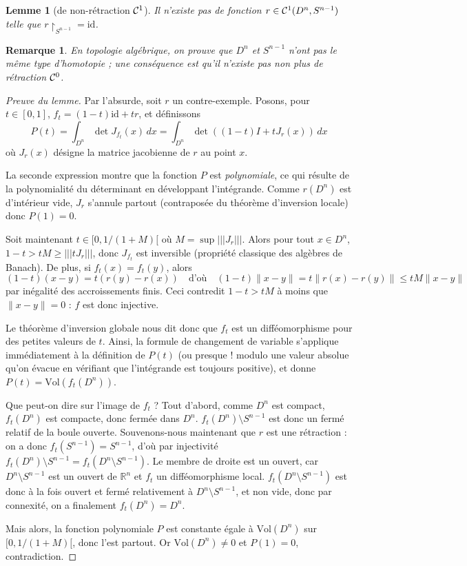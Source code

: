 \documentclass[a4paper, 11pt]{article}
\def\R{\mathbb{R}}
\def\Cf{{\cal{C}}}
\def\Vol{\mathrm{Vol}}
\newtheorem*{lemma}{Lemme}
\newtheorem*{remark}{Remarque}
\begin{document}
\begin{lemma}[de non-rétraction $\Cf^1$]
  Il n'existe pas de fonction $r \in \Cf^1(D^n, S^{n-1})$ telle que
  $r\restriction_{S^{n-1}} = \mathrm{id}$.
\end{lemma}
\begin{remark}
En topologie algébrique, on prouve que $D^n$ et $S^{n-1}$ n'ont pas le même type
d'homotopie ; une conséquence est qu'il n'existe pas non plus de rétraction
$\Cf^0$.
\end{remark}

\begin{proof}[Preuve du lemme]
  Par l'absurde, soit $r$ un contre-exemple.  
  Posons, pour $t \in [0,1]$, $f_t = (1-t)\mathrm{id} + tr$, et définissons
  \[ P(t) = \int_{D^n} \det J_{f_t}(x)\,dx = \int_{D^n} \det ((1-t)I +
    tJ_r(x))\,dx \]
  où $J_r(x)$ désigne la matrice jacobienne de $r$ au point $x$.

  La seconde expression montre que la fonction $P$ est \emph{polynomiale}, ce
  qui résulte de la polynomialité du déterminant en développant l'intégrande.
  Comme $r(D^n)$ est d'intérieur vide, $J_r$ s'annule partout (contraposée du
  théorème d'inversion locale) donc $P(1) = 0$.

  Soit maintenant $t \in [0,1/(1+M)[$ où $M = \sup |||J_r|||$. Alors pour tout
  $x \in D^n$, $1-t > tM \geq |||tJ_r|||$, donc $J_{f_t}$ est inversible
  (propriété classique des algèbres de Banach). De plus, si $f_t(x) = f_t(y)$,
  alors
  \[(1-t)(x-y) = t(r(y) - r(x)) \quad \text{d'où} \quad
    (1-t)\|x-y\| = t\|r(x) - r(y)\| \leq tM\|x-y\| \]
  par inégalité des accroissements finis. Ceci contredit $1-t > tM$
  à moins que $\|x-y\| = 0$ : $f$ est donc injective.

  Le théorème d'inversion globale nous dit donc que $f_t$ est un difféomorphisme
  pour des petites valeurs de $t$. Ainsi, la formule de changement de variable
  s'applique immédiatement à la définition de $P(t)$ (ou presque ! modulo une
  valeur absolue qu'on évacue en vérifiant que l'intégrande est toujours
  positive), et donne $P(t) = \Vol(f_t(D^n))$.

  Que peut-on dire sur l'image de $f_t$ ? Tout d'abord, comme $D^n$ est compact,
  $f_t(D^n)$ est compacte, donc fermée dans $D^n$. $f_t(D^n)\setminus S^{n-1}$
  est donc un fermé relatif de la boule ouverte. Souvenons-nous maintenant que
  $r$ est une rétraction : on a donc $f_t(S^{n-1}) = S^{n-1}$, d'où par
  injectivité $f_t(D^n)\setminus S^{n-1} = f_t(D^n \setminus S^{n-1})$. Le
  membre de droite est un ouvert, car $D^n \setminus S^{n-1}$ est un ouvert de
  $\R^n$ et $f_t$ un difféomorphisme local. $f_t(D^n\setminus S^{n-1})$ est donc
  à la fois ouvert et fermé relativement à $D^n \setminus S^{n-1}$, et non vide,
  donc par connexité, on a finalement $f_t(D^n) = D^n$.

  Mais alors, la fonction polynomiale $P$ est constante égale à $\Vol(D^n)$ sur
  $[0,1/(1+M)[$, donc l'est partout. Or $\Vol(D^n) \neq 0$ et $P(1) = 0$,
  contradiction.
\end{proof}
\end{document}
